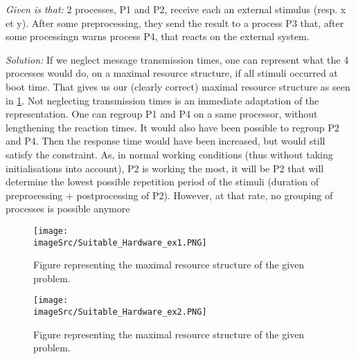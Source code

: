 \documentclass[../main.tex]{subfiles}
\begin{document}
\begin{exmp}
\emph{Given is that:} 2 processes, P1 and P2, receive each an external stimulus (resp. x et y). After some preprocessing, they send the result to a process P3 that, after some processingn warns process P4, that reacts on the external system. 

\emph{Solution:} If we neglect message transmission times, one can represent what the 4 processes would do, on a maximal resource structure, if all stimuli occurred at boot time.
That gives us our (clearly correct) maximal resource structure as seen in \ref{f:sh_ex1}.
Not neglecting transmission times is an immediate adaptation of the representation. One can regroup P1 and P4 on a same processor, without lengthening the reaction times. It would also have been possible to regroup P2 and P4. Then the response time would have been increased, but would still satisfy the constraint.
As, in normal working conditions (thus without taking initialisations into account), P2 is working the most, it will be P2 that will determine the lowest possible repetition period of the stimuli (duration of preprocessing + postprocessing of P2). However, at that rate, no grouping of processes is possible anymore



\begin{figure}
	\centering
	\texttt{[image: \\imageSrc/Suitable\_Hardware\_ex1.PNG]}
	\caption{Figure representing the maximal resource structure of the given problem.}
	\label{f:sh_ex1}
\end{figure}

\begin{figure}
	\centering
	\texttt{[image: \\imageSrc/Suitable\_Hardware\_ex2.PNG]}
	\caption{Figure representing the maximal resource structure of the given problem.}
	\label{f:sh_ex2}
\end{figure}
\end{exmp}
\end{document}
